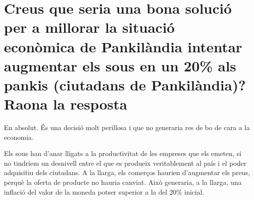 \section{Creus que seria una bona solució per a millorar la situació econòmica de
Pankilàndia intentar augmentar els sous en un 20\% als pankis (ciutadans de
Pankilàndia)? Raona la resposta}

En absolut. És una decisió molt perillosa i que no generaria res de bo
de cara a la economia.

Els sous han d'anar lligats a la productivitat de les empreses que els 
emeten, si no tindríem un desnivell entre el que es produeix veritablement
al país i el poder adquisitiu dels ciutadans. A la llarga, els comerços 
haurien d'augmentar els preus, perquè la oferta de producte no hauria 
canviat. Això generaria, a la llarga, una inflació del valor de la moneda
potser superior a la del 20\% inicial.
